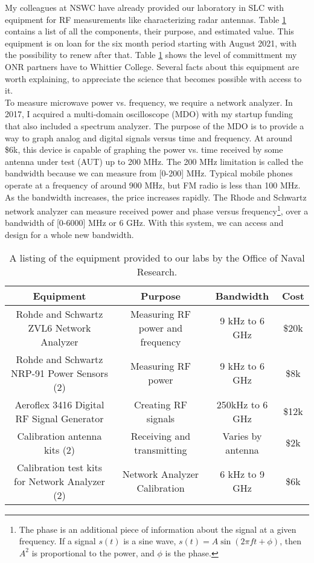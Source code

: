 \documentclass[../../../main.tex]{subfiles}
\begin{document}
My colleagues at NSWC have already provided our laboratory in SLC with equipment for RF measurements like characterizing radar antennas.  Table \ref{tab:equip} contains a list of all the components, their purpose, and estimated value.  This equipment is on loan for the six month period starting with August 2021, with the possibility to renew after that.  Table \ref{tab:equip} shows the level of committment my ONR partners have to Whittier College.  Several facts about this equipment are worth explaining, to appreciate the science that becomes possible with access to it.
\\
\vspace{0.25cm}
To measure microwave power vs. frequency, we require a network analyzer.  In 2017, I acquired a multi-domain oscilloscope (MDO) with my startup funding that also included a spectrum analyzer.  The purpose of the MDO is to provide a way to graph analog and digital signals versus time and frequency.  At around \$6k, this device is capable of graphing the power vs. time received by some antenna under test (AUT) up to 200 MHz.  The 200 MHz limitation is called the bandwidth because we can measure from [0-200] MHz.  Typical mobile phones operate at a frequency of around 900 MHz, but FM radio is less than 100 MHz.  As the bandwidth increases, the price increases rapidly.  The Rhode and Schwartz network analyzer can measure received power and phase versus frequency\footnote{The phase is an additional piece of information about the signal at a given frequency.  If a signal $s(t)$ is a sine wave, $s(t) = A\sin(2\pi f t + \phi)$, then $A^2$ is proportional to the power, and $\phi$ is the phase.}, over a bandwidth of [0-6000] MHz or 6 GHz.  With this system, we can access and design for a whole new bandwidth.
\\
\vspace{0.25cm}

\begin{table}
\centering
\begin{tabular}{c c c c}
Equipment & Purpose & Bandwidth & Cost \\ \hline
Rohde and Schwartz ZVL6 Network Analyzer & Measuring RF power and frequency & 9 kHz to 6 GHz & \$20k \\
Rohde and Schwartz NRP-91 Power Sensors (2) & Measuring RF power & 9 kHz to 6 GHz & \$8k \\
Aeroflex 3416 Digital RF Signal Generator & Creating RF signals & 250kHz to 6 GHz & \$12k \\
Calibration antenna kits (2) & Receiving and transmitting & Varies by antenna & \$2k \\
Calibration test kits for Network Analyzer (2) & Network Analyzer Calibration & 6 kHz to 9 GHz & \$6k
\end{tabular}
\caption{\label{tab:equip} A listing of the equipment provided to our labs by the Office of Naval Research.}
\end{table}
\end{document}
